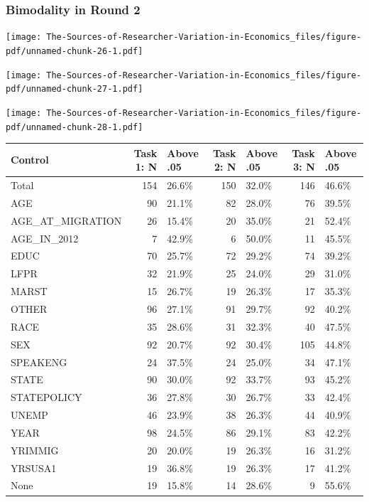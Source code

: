 \documentclass[
  letterpaper,
  DIV=11,
  numbers=noendperiod]{scrartcl}
\begin{document}
\hypertarget{bimodality-in-round-2}{%
\subsubsection{Bimodality in Round 2}\label{bimodality-in-round-2}}

\texttt{[image: The-Sources-of-Researcher-Variation-in-Economics\_files/figure-pdf/unnamed-chunk-26-1.pdf]}

\texttt{[image: The-Sources-of-Researcher-Variation-in-Economics\_files/figure-pdf/unnamed-chunk-27-1.pdf]}

\texttt{[image: The-Sources-of-Researcher-Variation-in-Economics\_files/figure-pdf/unnamed-chunk-28-1.pdf]}

\begin{tabular}{lrlrlrl}
\toprule
Control & Task 1: N & Above .05 & Task 2: N & Above .05 & Task 3: N & Above .05\\
\midrule
Total & 154 & 26.6\% & 150 & 32.0\% & 146 & 46.6\%\\
AGE & 90 & 21.1\% & 82 & 28.0\% & 76 & 39.5\%\\
AGE\_AT\_MIGRATION & 26 & 15.4\% & 20 & 35.0\% & 21 & 52.4\%\\
AGE\_IN\_2012 & 7 & 42.9\% & 6 & 50.0\% & 11 & 45.5\%\\
EDUC & 70 & 25.7\% & 72 & 29.2\% & 74 & 39.2\%\\
\addlinespace
LFPR & 32 & 21.9\% & 25 & 24.0\% & 29 & 31.0\%\\
MARST & 15 & 26.7\% & 19 & 26.3\% & 17 & 35.3\%\\
OTHER & 96 & 27.1\% & 91 & 29.7\% & 92 & 40.2\%\\
RACE & 35 & 28.6\% & 31 & 32.3\% & 40 & 47.5\%\\
SEX & 92 & 20.7\% & 92 & 30.4\% & 105 & 44.8\%\\
\addlinespace
SPEAKENG & 24 & 37.5\% & 24 & 25.0\% & 34 & 47.1\%\\
STATE & 90 & 30.0\% & 92 & 33.7\% & 93 & 45.2\%\\
STATEPOLICY & 36 & 27.8\% & 30 & 26.7\% & 33 & 42.4\%\\
UNEMP & 46 & 23.9\% & 38 & 26.3\% & 44 & 40.9\%\\
YEAR & 98 & 24.5\% & 86 & 29.1\% & 83 & 42.2\%\\
\addlinespace
YRIMMIG & 20 & 20.0\% & 19 & 26.3\% & 16 & 31.2\%\\
YRSUSA1 & 19 & 36.8\% & 19 & 26.3\% & 17 & 41.2\%\\
None & 19 & 15.8\% & 14 & 28.6\% & 9 & 55.6\%\\
\bottomrule
\end{tabular}
\end{document}
